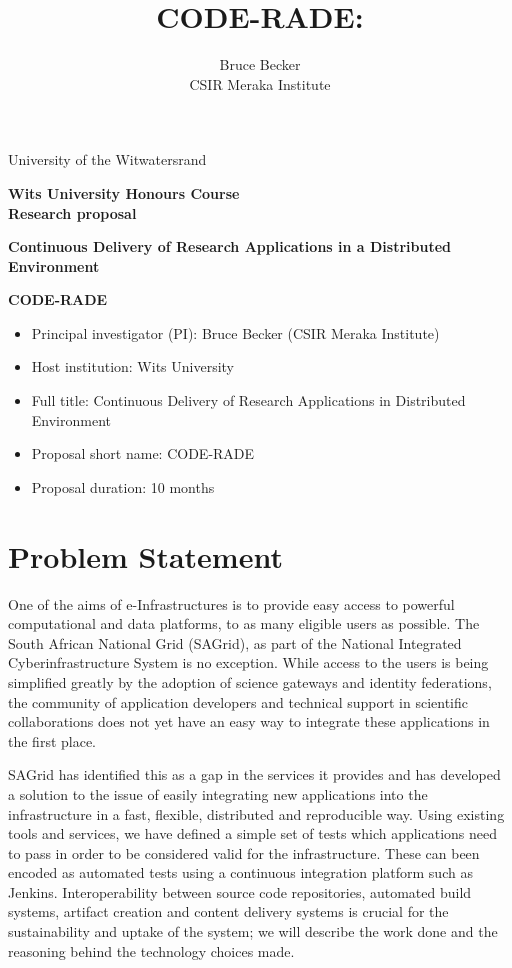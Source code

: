 \documentclass[oneside, a4paper, onecolumn, 11pt]{article}
\title{CODE-RADE:\\ }
\author{Bruce Becker\\ CSIR Meraka Institute}
\begin{document}
\noindent
University of the Witwatersrand

\vfill

\begin{center}
\large{\textbf{Wits University Honours Course\\
Research proposal }
}
\vfill

\LARGE{\textbf{Continuous Delivery of Research Applications in a Distributed Environment }}

\vfill

\LARGE{\textbf{CODE-RADE}}

\vfill

\end{center}

\vfill

\begin{itemize}
\item Principal investigator (PI): Bruce Becker (CSIR Meraka Institute)
\item Host institution: Wits University
\item Full title: Continuous Delivery of Research Applications in Distributed Environment
\item Proposal short name: CODE-RADE
\item Proposal duration: 10 months
\end{itemize}


\vfill

\noindent
\section{Problem Statement}
One of the aims of e-Infrastructures is to provide easy access to powerful computational and data platforms, to as many eligible users as possible. The South African National Grid (SAGrid), as part of the National Integrated Cyberinfrastructure System is no exception. While access to the users is being simplified greatly by the adoption of science gateways and identity federations, the community of application developers and technical support in scientific collaborations does not yet have an easy way to integrate these applications in the first place.

SAGrid has identified this as a gap in the services it provides and has developed a solution to the issue of easily integrating new applications into the infrastructure in a fast, flexible, distributed and reproducible way. Using existing tools and services, we have defined a simple set of tests which applications need to pass in order to be considered valid for the infrastructure. These can been encoded as automated tests using a continuous integration platform such as Jenkins. Interoperability between source code repositories, automated build systems, artifact creation and content delivery systems is crucial for the sustainability and uptake of the system; we will describe the work done and the reasoning behind the technology choices made.
\end{document}
